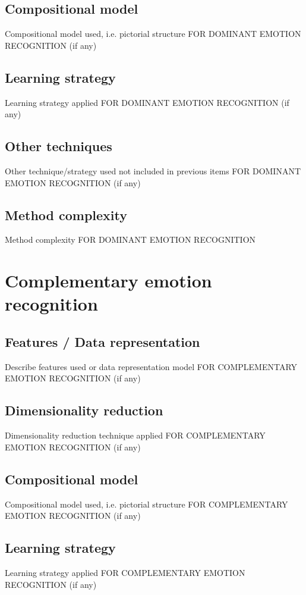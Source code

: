 \documentclass{article}
\begin{document}
\subsection{Compositional model}
Compositional model used, i.e. pictorial structure FOR DOMINANT EMOTION RECOGNITION (if any)

\subsection{Learning strategy}
Learning strategy applied FOR DOMINANT EMOTION RECOGNITION (if any)

\subsection{Other techniques}
Other technique/strategy used not included in previous items FOR DOMINANT EMOTION RECOGNITION (if any)

\subsection{Method complexity}
Method complexity FOR DOMINANT EMOTION RECOGNITION


\section{Complementary emotion recognition}
\subsection{Features / Data representation}
Describe features used or data representation model FOR COMPLEMENTARY EMOTION RECOGNITION (if any)

\subsection{Dimensionality reduction}
Dimensionality reduction technique applied FOR COMPLEMENTARY EMOTION RECOGNITION (if any)

\subsection{Compositional model}
Compositional model used, i.e. pictorial structure FOR COMPLEMENTARY EMOTION RECOGNITION (if any)

\subsection{Learning strategy}
Learning strategy applied FOR COMPLEMENTARY EMOTION RECOGNITION (if any)
\end{document}
